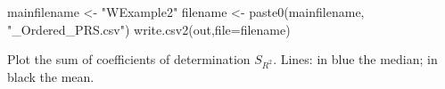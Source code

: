 \documentclass[
]{article}
\newenvironment{Shaded}{\begin{snugshade}}{\end{snugshade}}
\newcommand{\AttributeTok}[1]{\textcolor[rgb]{0.77,0.63,0.00}{#1}}
\newcommand{\ConstantTok}[1]{\textcolor[rgb]{0.00,0.00,0.00}{#1}}
\newcommand{\DecValTok}[1]{\textcolor[rgb]{0.00,0.00,0.81}{#1}}
\newcommand{\FunctionTok}[1]{\textcolor[rgb]{0.00,0.00,0.00}{#1}}
\newcommand{\NormalTok}[1]{#1}
\newcommand{\OtherTok}[1]{\textcolor[rgb]{0.56,0.35,0.01}{#1}}
\newcommand{\SpecialCharTok}[1]{\textcolor[rgb]{0.00,0.00,0.00}{#1}}
\newcommand{\StringTok}[1]{\textcolor[rgb]{0.31,0.60,0.02}{#1}}
\begin{document}
\begin{Shaded}
\begin{Highlighting}[]
\NormalTok{mainfilename }\OtherTok{\textless{}{-}} \StringTok{"WExample2"}
\NormalTok{filename }\OtherTok{\textless{}{-}} \FunctionTok{paste0}\NormalTok{(mainfilename, }\StringTok{"\_Ordered\_PRS.csv"}\NormalTok{)}
\FunctionTok{write.csv2}\NormalTok{(out,}\AttributeTok{file=}\NormalTok{filename)}
\end{Highlighting}
\end{Shaded}

\bigskip

Plot the sum of coefficients of determination \(S_{R^2}\). Lines: in
blue the median; in black the mean.

\begin{Shaded}
\end{Shaded}
\end{document}
